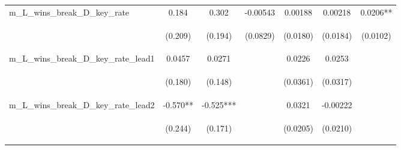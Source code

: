 \documentclass[]{article}
\begin{document}
\begin{center}
\begin{tabular}{lcccccc}
m\_L\_wins\_break\_D\_key\_rate & 0.184 & 0.302 & -0.00543 & 0.00188 & 0.00218 & 0.0206** \\
\vspace{4pt} & \begin{footnotesize}(0.209)\end{footnotesize} & \begin{footnotesize}(0.194)\end{footnotesize} & \begin{footnotesize}(0.0829)\end{footnotesize} & \begin{footnotesize}(0.0180)\end{footnotesize} & \begin{footnotesize}(0.0184)\end{footnotesize} & \begin{footnotesize}(0.0102)\end{footnotesize} \\
m\_L\_wins\_break\_D\_key\_rate\_lead1 & 0.0457 & 0.0271 &  & 0.0226 & 0.0253 &  \\
\vspace{4pt} & \begin{footnotesize}(0.180)\end{footnotesize} & \begin{footnotesize}(0.148)\end{footnotesize} & \begin{footnotesize}\end{footnotesize} & \begin{footnotesize}(0.0361)\end{footnotesize} & \begin{footnotesize}(0.0317)\end{footnotesize} & \begin{footnotesize}\end{footnotesize} \\
m\_L\_wins\_break\_D\_key\_rate\_lead2 & -0.570** & -0.525*** &  & 0.0321 & -0.00222 &  \\
\vspace{4pt} & \begin{footnotesize}(0.244)\end{footnotesize} & \begin{footnotesize}(0.171)\end{footnotesize} & \begin{footnotesize}\end{footnotesize} & \begin{footnotesize}(0.0205)\end{footnotesize} & \begin{footnotesize}(0.0210)\end{footnotesize} & \begin{footnotesize}\end{footnotesize} \\

\end{tabular}
\end{center}
\end{document}
